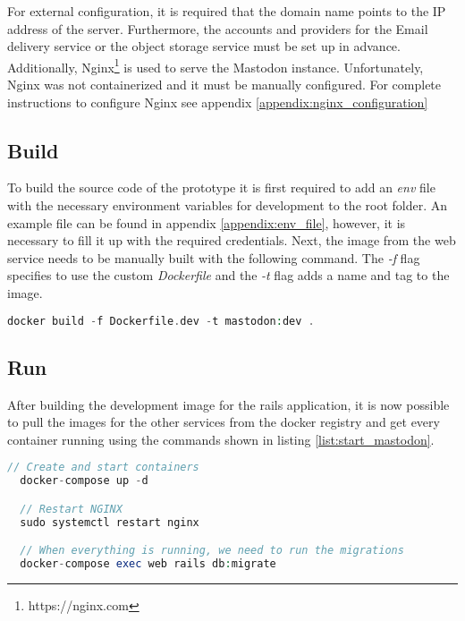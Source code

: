 For external configuration, it is required that the domain name points to the IP address of the server. Furthermore, the accounts and providers for the Email delivery service or the object storage service must be set up in advance. 
Additionally, Nginx\footnote{https://nginx.com} is used to serve the Mastodon instance. Unfortunately, Nginx was not containerized and it must be manually configured. For complete instructions to configure Nginx see appendix \ref{appendix:nginx_configuration} 


\subsection{Build}

To build the source code of the prototype it is first required to add an \emph{env} file with the necessary environment variables for development to the root folder. An example file can be found in appendix \ref{appendix:env_file}, however, it is necessary to fill it up with the required credentials. Next, the image from the web service needs to be manually built with the following command. The \emph{-f} flag specifies to use the custom \emph{Dockerfile} and the \emph{-t} flag adds a name and tag to the image. 
  
\lstset{style=CodeStyle}
  \begin{lstlisting}[language=PHP, caption=Building the development Dockerfile, float=h]
    docker build -f Dockerfile.dev -t mastodon:dev .
  \end{lstlisting}


\subsection{Run}
After building the development image for the rails application, it is now possible to pull the images for the other services from the docker registry and get every container running using the commands shown in listing \ref{list:start_mastodon}.

\lstset{style=CodeStyle}
\begin{lstlisting}[language=PHP, caption=Starting all services of Mastodon, label=list:start_mastodon, float=ht]
  // Create and start containers
  docker-compose up -d

  // Restart NGINX
  sudo systemctl restart nginx

  // When everything is running, we need to run the migrations
  docker-compose exec web rails db:migrate
\end{lstlisting}


